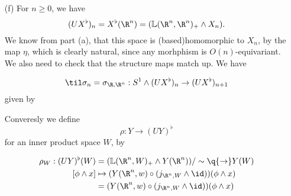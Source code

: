 \begin{exercise}[2]
\begin{enumerate}
\item[(f)]
For $n \ge 0$, we have 
\[ (UX^\flat)_n = X^\flat(\R^n) = (\L(\R^n,\R^n)_+  \wedge X_n). \]
We know from part (a), that this space is (based)homomorphic to $X_n$, by the
map $\eta$, which is clearly natural, since any morhphism is $O(n)$-equivariant.
We also need to check that the structure maps match up. We have

\[ \til\sigma_n = \sigma_{\R,\R^n} : S^1 \wedge (UX^\flat)_n \to (U
X^\flat)_{n+1} \]
given by

Converesly we define 
\[ \rho : Y \to (UY)^\flat \]
for an inner product space $W$, by

\begin{align*}
\rho_W : (UY)^\flat(W) &= (\L(\R^n,W)_+ \wedge Y(\R^n))/\sim \q{\to} Y(W) \\
\text{$[$} \phi \wedge x] &\mapsto (Y(\R^n,w) \circ (j_{\R^n,W} \wedge \id))(\phi \wedge
x) \\
&= (Y(\R^n,w) \circ (j_{\R^n,W} \wedge \id))(\phi \wedge x) 
\end{align*}

% 

\end{enumerate}
\end{exercise}


